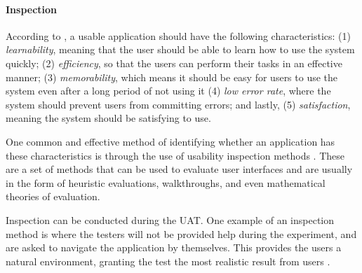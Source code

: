             
       
            \paragraph{Inspection}
            
            According to \citet{holzinger2005usability}, a usable application should have the following characteristics: (1) \textit{learnability}, meaning that the user should be able to learn how to use the system quickly; (2) \textit{efficiency}, so that the users can perform their tasks in an effective manner; (3) \textit{memorability}, which means it should be easy for users to use the system even after a long period of not using it (4) \textit{low error rate}, where the system should prevent users from committing errors; and lastly, (5) \textit{satisfaction}, meaning the system should be satisfying to use.  
            
            
            One common and effective method of identifying whether an application has these characteristics is through the use of usability inspection methods \citep{nielsen1994usability, porter1996review, fagan1999design, laitenberger2002survey}. These are a set of methods that can be used to evaluate user interfaces and are usually in the form of heuristic evaluations, walkthroughs, and even mathematical theories of evaluation. 
            
            Inspection can be conducted during the UAT. One example of an inspection method is where the testers will not be provided help during the experiment, and are asked to navigate the application by themselves. This provides the users a natural environment, granting the test the most realistic result from users \citep{gomoll1996some}.
            
